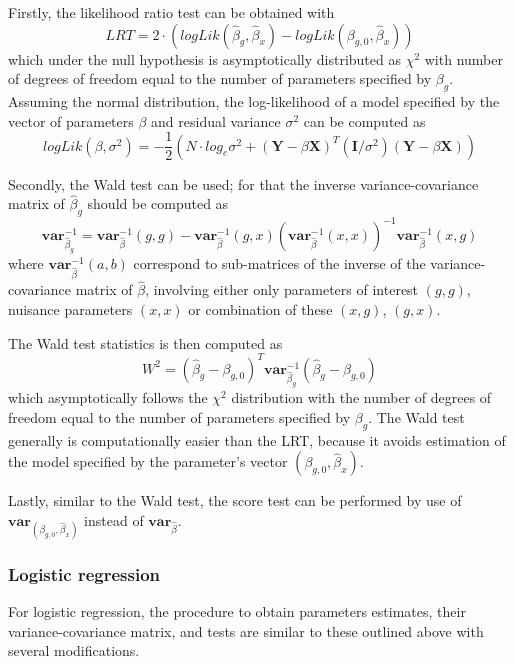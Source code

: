 \documentclass[12pt,a4paper]{article}
\begin{document}
Firstly, the likelihood ratio test can be obtained with
$$
LRT = 2 \cdot (logLik(\hat{\beta}_g,\hat{\beta}_x) - logLik(\beta_{g,0},\hat{\beta}_x))
$$
which under the null hypothesis is asymptotically distributed as $\chi^2$ with 
number of degrees of freedom equal to the number of parameters specified 
by $\beta_g$. Assuming the normal distribution, the log-likelihood of a 
model specified by the vector of parameters $\beta$ and residual variance 
$\sigma^2$ can be computed as
$$
logLik(\beta,\sigma^2) = 
-\frac{1}{2} ( N \cdot log_e \sigma^2 +
(\mathbf{Y} - \beta \mathbf{X})^T (\mathbf{I}/\sigma^2) (\mathbf{Y} - \beta \mathbf{X}) )
$$

Secondly, the Wald test can be used; for that the inverse variance-covariance
matrix of $\hat{\beta}_g$ should be computed as 
$$
\mathbf{var}_{\hat{\beta}_g}^{-1} = \mathbf{var}_{\hat{\beta}}^{-1}(g,g) - 
\mathbf{var}_{\hat{\beta}}^{-1}(g,x) (\mathbf{var}_{\hat{\beta}}^{-1}(x,x))^{-1} \mathbf{var}_{\hat{\beta}}^{-1}(x,g)
$$
where $\mathbf{var}_{\hat{\beta}}^{-1}(a,b)$ correspond to sub-matrices of the inverse of the 
variance-covariance matrix of $\hat{\beta}$, involving either only parameters of interest 
$(g,g)$, nuisance parameters $(x,x)$ or combination of these $(x,g)$, $(g,x)$.

The Wald test statistics is then computed as 
$$
W^2 = (\hat{\beta}_g - \beta_{g,0})^T \mathbf{var}_{\hat{\beta}_g}^{-1} (\hat{\beta}_g - \beta_{g,0})
$$
which asymptotically follows the $\chi^2$ distribution with the number of degrees 
of freedom equal to the number of parameters specified by $\beta_g$. The Wald test generally 
is computationally easier than the LRT, because it avoids estimation of the model 
specified by the parameter's vector $(\beta_{g,0},\hat{\beta}_x)$.

Lastly, similar to the Wald test, the score test can be performed by use 
of $\mathbf{var}_{(\beta_{g,0},\hat{\beta}_x)}$ instead of $\mathbf{var}_{\hat{\beta}}$.


\subsubsection{Logistic regression}

For logistic regression, the procedure to obtain 
parameters estimates, their variance-covariance matrix, and tests are 
similar to these outlined above with several modifications. 
\end{document}
